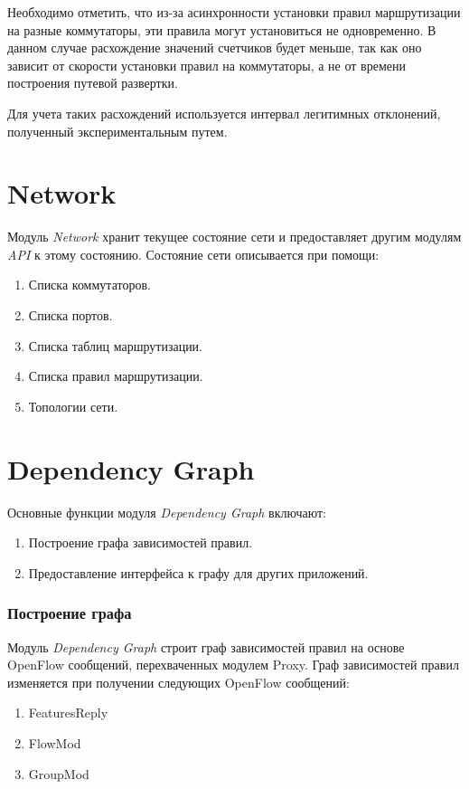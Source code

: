 \documentclass[../thesis.tex]{subfiles}
\begin{document}
Необходимо отметить, что из-за асинхронности установки правил маршрутизации на разные коммутаторы, эти правила могут установиться не одновременно.
В данном случае расхождение значений счетчиков будет меньше, так как оно зависит от скорости установки правил на коммутаторы, а не от времени построения путевой развертки.

Для учета таких расхождений используется интервал легитимных отклонений, полученный экспериментальным путем.

\section{Network}

Модуль \textit{Network} хранит текущее состояние сети и предоставляет другим модулям \textit{API} к этому состоянию.
Состояние сети описывается при помощи:
\begin{enumerate}
\item Списка коммутаторов.
\item Списка портов.
\item Списка таблиц маршрутизации.
\item Списка правил маршрутизации.
\item Топологии сети.
\end{enumerate}

\section{Dependency Graph}

Основные функции модуля \textit{Dependency Graph} включают:
\begin{enumerate}
\item Построение графа зависимостей правил.
\item Предоставление интерфейса к графу для других приложений.
\end{enumerate}

\subsubsection{Построение графа}

Модуль \textit{Dependency Graph} строит граф зависимостей правил на основе OpenFlow сообщений, перехваченных модулем Proxy.
Граф зависимостей правил изменяется при получении следующих OpenFlow сообщений:
\begin{enumerate}
\item FeaturesReply
\item FlowMod
\item GroupMod
\end{enumerate}
\end{document}
